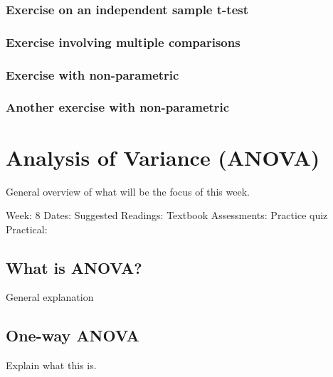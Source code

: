 \documentclass[
]{book}
\begin{document}
\hypertarget{exercise-on-an-independent-sample-t-test}{%
\section{Exercise on an independent sample t-test}\label{exercise-on-an-independent-sample-t-test}}

\hypertarget{exercise-involving-multiple-comparisons}{%
\section{Exercise involving multiple comparisons}\label{exercise-involving-multiple-comparisons}}

\hypertarget{exercise-with-non-parametric}{%
\section{Exercise with non-parametric}\label{exercise-with-non-parametric}}

\hypertarget{another-exercise-with-non-parametric}{%
\section{Another exercise with non-parametric}\label{another-exercise-with-non-parametric}}

\hypertarget{part-analysis-of-variance-anova}{%
\part{Analysis of Variance (ANOVA)}\label{part-analysis-of-variance-anova}}

General overview of what will be the focus of this week.

Week: 8
Dates:
Suggested Readings: Textbook
Assessments: Practice quiz
Practical:

\hypertarget{what-is-anova}{%
\chapter{What is ANOVA?}\label{what-is-anova}}

General explanation

\hypertarget{one-way-anova}{%
\chapter{One-way ANOVA}\label{one-way-anova}}

Explain what this is.
\end{document}
